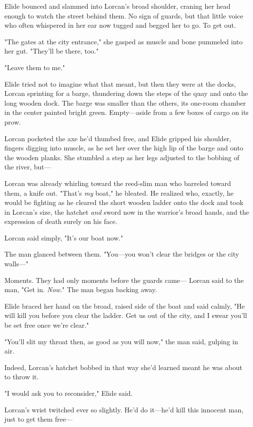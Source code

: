 Elide bounced and slammed into Lorcan's broad shoulder, craning her head enough to watch the street behind them. No sign of guards, but 
that little voice who often whispered in her ear now tugged and begged her to go. To get out.

"The gates at the city entrance," she gasped as muscle and bone pummeled into her gut. "They'll be there, too."

"Leave them to me."

Elide tried not to imagine what that meant, but then they were at the docks, Lorcan sprinting for a barge, thundering down the steps of the quay and onto the long wooden dock. The barge was smaller than the others, its one-room chamber in the center painted bright green. Empty---aside from a few boxes of cargo on its prow.

Lorcan pocketed the axe he'd thumbed free, and Elide gripped his shoulder, fingers digging into muscle, as he set her over the high lip of the barge and onto the wooden planks. She stumbled a step as her legs adjusted to the bobbing of the river, but---

Lorcan was already whirling toward the reed-slim man who barreled toward them, a knife out. "That's \emph{my} boat," he bleated. He realized who, exactly, he would be fighting as he cleared the short wooden ladder onto the dock and took in Lorcan's size, the hatchet \emph{and} sword now in the warrior's broad hands, and the expression of death surely on his face.

Lorcan said simply, "It's our boat now."

The man glanced between them. "You---you won't clear the bridges or the city walls---"

Moments. They had only moments before the guards came--- Lorcan said to the man, "Get in. \emph{Now}." The man began backing away.

Elide braced her hand on the broad, raised side of the boat and said calmly, "He will kill you before you clear the ladder. Get us out of the city, and I swear you'll be set free once we're clear."

"You'll slit my throat then, as good as you will now," the man said, gulping in air.

Indeed, Lorcan's hatchet bobbed in that way she'd learned meant he was about to throw it.

"I would ask you to reconsider," Elide said.

Lorcan's wrist twitched ever so slightly. He'd do it---he'd kill this innocent man, just to get them free---

